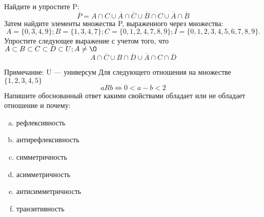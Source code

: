 \documentclass[10pt]{exam}
\begin{document}
\begin{questions}
\question
Найдите и упростите P:
\begin{equation*}
\overline{P} = A \cap C \cup \overline{A} \cap \overline{C} \cup \overline{B} \cap C \cup \overline{A} \cap \overline{B}
\end{equation*}
Затем найдите элементы множества P, выраженного через множества:
\begin{equation*}
A = \{0, 3, 4, 9\}; 
B = \{1, 3, 4, 7\};
C = \{0, 1, 2, 4, 7, 8, 9\};
I = \{0, 1, 2, 3, 4, 5, 6, 7, 8, 9\}.
\end{equation*}\question
Упростите следующее выражение с учетом того, что $A\subset B \subset C \subset D \subset U; A \neq \O$
\begin{equation*}
A \cap  \overline{C} \cup B \cap \overline{D} \cup  \overline{A} \cap C \cap  \overline{D}
\end{equation*}

Примечание: U — универсум\question
Для следующего отношения на множестве $\{1, 2, 3, 4, 5\}$ 
\begin{equation*}
aRb \iff 0 < a-b<2
\end{equation*}
Напишите обоснованный ответ какими свойствами обладает или не обладает отношение и почему:   
\begin{enumerate} [a)]\setcounter{enumi}{0}
\item рефлексивность
\item антирефлексивность
\item симметричность
\item асимметричность
\item антисимметричность
\item транзитивность
\end{enumerate}


\end{questions}
\end{document}

